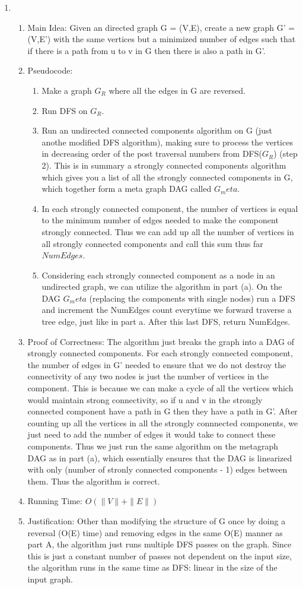 \documentclass[11pt]{article}
\newenvironment{qparts}{\begin{enumerate}[{(}a{)}]}{\end{enumerate}}
\begin{document}
\begin{qparts}
\item
\begin{enumerate}
\item Main Idea: Given an directed graph G = (V,E), create a new graph G' = (V,E') with the same vertices but a minimized number of edges such that if there is a path from u to v in G then there is also a path in G'.
\item Pseudocode:
\begin{enumerate}
\item Make a graph $G_R$ where all the edges in G are reversed.
\item Run DFS on $G_R$.
\item Run an undirected connected components algorithm on G (just anothe modified DFS algorithm), making sure to process the vertices in decreasing order of the post traversal numbers from DFS($G_R$) (step 2). This is in summary a strongly connected components algorithm which gives you a list of all the strongly connected components in G, which together form a meta graph DAG called $G_meta$.
\item In each strongly connected component, the number of vertices is equal to the minimum number of edges needed to make the component strongly connected. Thus we can add up all the number of vertices in all strongly connected components and call this sum thus far $NumEdges$.
\item Considering each strongly connected component as a node in an undirected graph, we can utilize the algorithm in part (a). On the DAG $G_meta$ (replacing the components with single nodes) run a DFS and increment the NumEdges count everytime we forward traverse a tree edge, just like in part a. After this last DFS, return NumEdges.
\end{enumerate}
\item Proof of Correctness: The algorithm just breaks the graph into a DAG of strongly connected components. For each strongly connected component, the number of edges in G' needed to ensure that we do not destroy the connectivity of any two nodes is just the number of vertices in the component. This is because we can make a cycle of all the vertices which would maintain strong connectivity, so if u and v in the strongly connected component have a path in G then they have a path in G'. After counting up all the vertices in all the strongly connnected components, we just need to add the number of edges it would take to connect these components. Thus we just run the same algorithm on the metagraph DAG as in part (a), which essentially ensures that the DAG is linearized with only (number of stronly connected components - 1) edges between them. Thus the algorithm is correct.
\item Running Time: $O(\|V\|+\|E\|)$
\item Justification: Other than modifying the structure of G once by doing a reversal (O(E) time) and removing edges in the same O(E) manner as part A, the algorithm just runs multiple DFS passes on the graph. Since this is just a constant number of passes not dependent on the input size, the algorithm runs in the same time as DFS: linear in the size of the input graph.
\end{enumerate}



\end{qparts}
\end{document}
